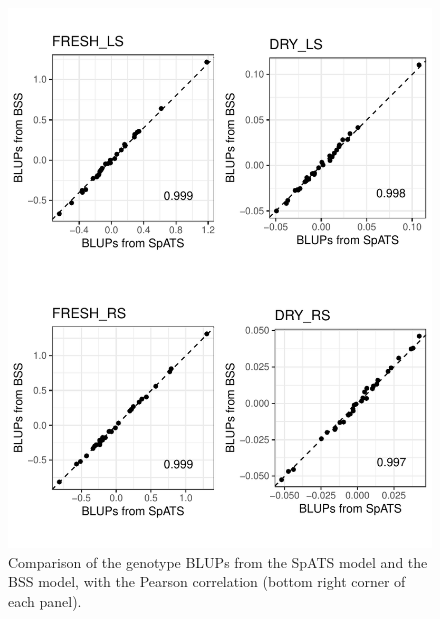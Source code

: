 \begin{figure}
	\centering
	\includegraphics[width=\textwidth]{../../Figures/Genotype_Comparative_plots.pdf} 
	\caption[Comparison of the genotype BLUPs from the SpATS model and the BSS model]{Comparison of the genotype BLUPs from the SpATS model and the BSS model, with the Pearson correlation (bottom right corner of each panel).}
	\label{fig:genotype_comparison_BSS_SPATS}
\end{figure}

